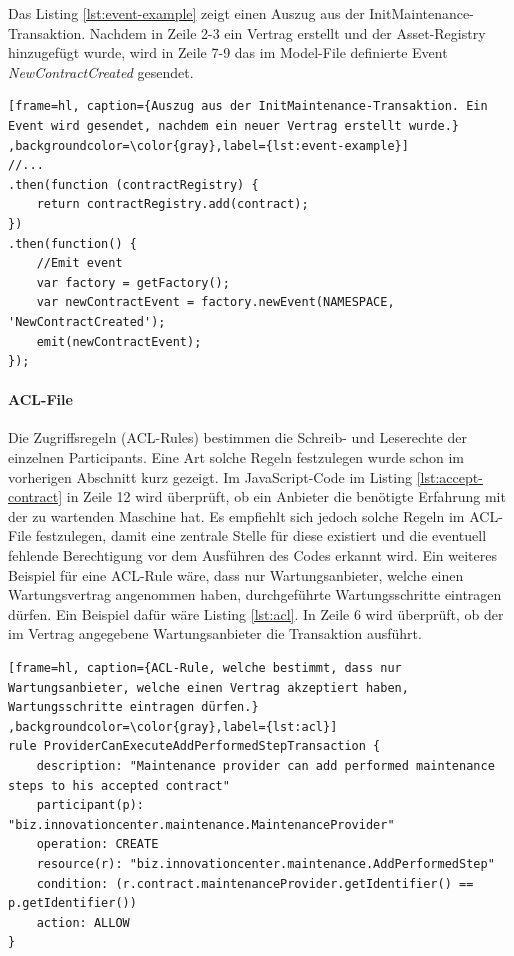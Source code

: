 Das Listing \ref{lst:event-example} zeigt einen Auszug aus der InitMaintenance-Transaktion. Nachdem in Zeile 2-3 ein Vertrag erstellt und der Asset-Registry hinzugefügt wurde, wird in Zeile 7-9 das im Model-File definierte Event \textit{NewContractCreated} gesendet.

\begin{lstfloat}
\begin{lstlisting}[frame=hl, caption={Auszug aus der InitMaintenance-Transaktion. Ein Event wird gesendet, nachdem ein neuer Vertrag erstellt wurde.} ,backgroundcolor=\color{gray},label={lst:event-example}]
//...
.then(function (contractRegistry) {
    return contractRegistry.add(contract);
})
.then(function() {
    //Emit event
    var factory = getFactory();
    var newContractEvent = factory.newEvent(NAMESPACE, 'NewContractCreated');
    emit(newContractEvent);
});
\end{lstlisting} 
\end{lstfloat}

\paragraph{ACL-File}
Die Zugriffsregeln (ACL-Rules) bestimmen die Schreib- und Leserechte der einzelnen Participants. Eine Art solche Regeln festzulegen wurde schon im vorherigen Abschnitt kurz gezeigt. Im JavaScript-Code im Listing \ref{lst:accept-contract} in Zeile 12 wird überprüft, ob ein Anbieter die benötigte Erfahrung mit der zu wartenden Maschine hat. Es empfiehlt sich jedoch solche Regeln im ACL-File festzulegen, damit eine zentrale Stelle für diese existiert und die eventuell fehlende Berechtigung vor dem Ausführen des Codes erkannt wird. Ein weiteres Beispiel für eine ACL-Rule wäre, dass nur Wartungsanbieter, welche einen Wartungsvertrag angenommen haben, durchgeführte Wartungsschritte eintragen dürfen. Ein Beispiel dafür wäre Listing \ref{lst:acl}. In Zeile 6 wird überprüft, ob der im Vertrag angegebene Wartungsanbieter die Transaktion ausführt.

\begin{lstfloat}
\begin{lstlisting}[frame=hl, caption={ACL-Rule, welche bestimmt, dass nur Wartungsanbieter, welche einen Vertrag akzeptiert haben, Wartungsschritte eintragen dürfen.} ,backgroundcolor=\color{gray},label={lst:acl}]
rule ProviderCanExecuteAddPerformedStepTransaction {
    description: "Maintenance provider can add performed maintenance steps to his accepted contract"
    participant(p): "biz.innovationcenter.maintenance.MaintenanceProvider"
    operation: CREATE
    resource(r): "biz.innovationcenter.maintenance.AddPerformedStep"
    condition: (r.contract.maintenanceProvider.getIdentifier() == p.getIdentifier())
    action: ALLOW
}
\end{lstlisting} 
\end{lstfloat}

